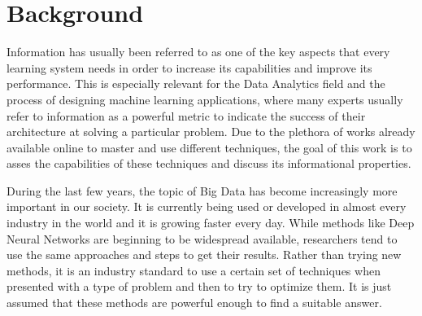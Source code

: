 \label{chap:Introduction}

\section{Background}
Information has usually been referred to as one of the key aspects that every learning system needs in order to increase its capabilities and improve its performance. This is especially relevant for the Data Analytics field and the process of designing machine learning applications, where many experts usually refer to information as a powerful metric to indicate the success of their architecture at solving a particular problem. Due to the plethora of works already available online to master and use different techniques, the goal of this work is to asses the capabilities of these techniques and discuss its informational properties. 


During the last few years, the topic of Big Data has become increasingly more important in our society. It is currently being used or developed in almost every industry in the world \cite{article_Big_Data} and it is growing faster every day. While methods like Deep Neural Networks are beginning to be widespread available,  researchers tend to use the same approaches and steps to get their results. Rather than trying new methods, it is an industry standard to use a certain set of techniques when presented with a type of problem and then to try to optimize them. It is just assumed that these methods are powerful enough to find a suitable answer. 

